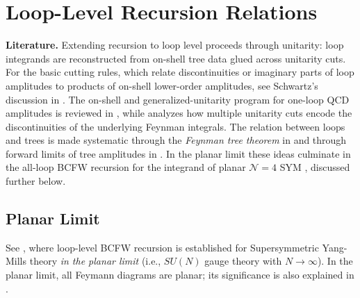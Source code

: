 \section{Loop-Level Recursion Relations}
\label{sec:loop-level-recursion}

\textbf{Literature.} Extending recursion to loop level proceeds through unitarity: loop integrands are reconstructed from on-shell tree data glued across unitarity cuts.
For the basic cutting rules, which relate discontinuities or imaginary parts of loop amplitudes to products of on-shell lower-order amplitudes, see Schwartz's discussion in \autocite[\S24.1.2]{schwartzQFT2014}.
The on-shell and generalized-unitarity program for one-loop QCD amplitudes is reviewed in \autocite{bernOnShellMethods2007}, while \autocite{Abreu:2014cla} analyzes how multiple unitarity cuts encode the discontinuities of the underlying Feynman integrals. The relation between loops and trees is made systematic through the \textit{Feynman tree theorem} in \autocite{brandhuberTreesLoops2006} and through forward limits of tree amplitudes in \autocite{Caron-Huot:2010fvq}. In the planar limit these ideas culminate in the all-loop BCFW recursion for the integrand of planar $\mathcal{N}=4$ SYM \autocite{Arkani-Hamed:2010zjl}, discussed further below.

\subsection{Planar Limit}
\label{subsec:planar-limit}

See \autocite{Arkani-Hamed:2010zjl}, where loop-level BCFW recursion is established for Supersymmetric Yang-Mills theory \textit{in the planar limit} (i.e., $SU(N)$ gauge theory with $N \to \infty$). In the planar limit, all Feymann diagrams are planar; its significance is also explained in \autocite{Beisert:2010jr}.